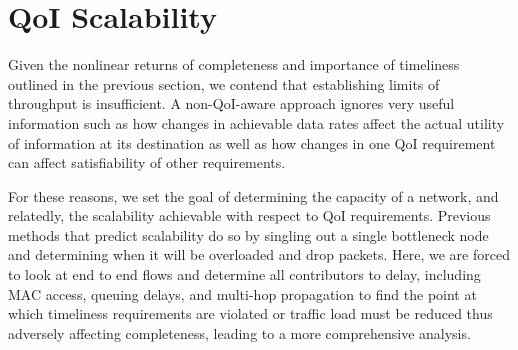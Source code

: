 \section{QoI Scalability}
\label{sec:qoi_scalability}


Given the nonlinear returns of completeness and importance of timeliness outlined in the previous section, we contend that establishing limits of throughput is insufficient.  A non-QoI-aware approach ignores very useful information such as how changes in achievable data rates affect the actual utility of information at its destination as well as how changes in one QoI requirement can affect satisfiability of other requirements.  

For these reasons, we set the goal of determining the capacity of a network, and relatedly, the scalability achievable with respect to QoI requirements.  Previous methods that predict scalability do so by singling out a single bottleneck node and determining when it will be overloaded and drop packets. Here, we are forced to look at end to end flows and determine all contributors to delay, including MAC access, queuing delays, and multi-hop propagation to find the point at which timeliness requirements are violated or traffic load must be reduced thus adversely affecting completeness, leading to a more comprehensive analysis.

